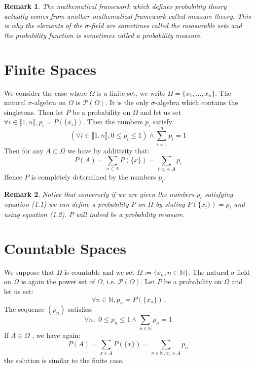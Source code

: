 \documentclass[10pt,a4paper]{book}
\newtheorem*{remark}{Remark}
\theoremstyle{definition}
\begin{document}
\begin{remark}
The mathematical framework which defines probability theory actually comes from another mathematical framework called measure theory. This is why the elements of the $\sigma$-field are sometimes called the measurable sets and the probability function is sometimes called a probability measure.
\end{remark}

\section{Finite Spaces}
We consider the case where $\Omega$ is a finite set, we write $\Omega = \{x_1, \ldots, x_n\}$. The natural $\sigma$-algebra on $\Omega$ is $\mathcal{P}(\Omega)$. It is the only $\sigma$-algebra which contains the singletons. Then let $P$ be a probability on $\Omega$ and let us set $\forall i \in \llbracket 1, n\rrbracket, p_i = P(\{x_i\})$. Then the numbers $p_i$ satisfy:
\begin{equation}
\left( \forall i \in \llbracket 1, n\rrbracket, 0 \leq p_i \leq 1\right) \land \sum_{i = 1}^n p_i = 1
\end{equation}
Then for any $A \subset \Omega$ we have by additivity that:
\begin{equation}
P(A) = \sum_{x \in A} P(\{x\}) = \sum_{i : x_i \in A} p_i
\end{equation}
Hence $P$ is completely determined by the numbers $p_i$.


\begin{remark}
Notice that conversely if we are given the numbers $p_i$ satisfying equation (1.1) we can define a probability $P$ on $\Omega$ by stating $P(\{x_i\}) = p_i$ and using equation (1.2). $P$ will indeed be a probability measure.
\end{remark}

\section{Countable Spaces}
We suppose that $\Omega$ is countable and we set $\Omega := \{ x_n , n \in \mathbb{N}\}$. The natural $\sigma$-field on $\Omega$ is again the power set of $\Omega$, i.e. $\mathcal{P}(\Omega)$. Let $P$ be a probability on $\Omega$ and let us set:
$$\forall n\in\mathbb{N}, p_n=P(\{x_n\}).$$
The sequence $(p_n)$ satisfies:
$$\forall n,\,\, 0\leq p_n\leq 1\land \sum_{n\in\mathbb{N}}p_n=1$$
If $A\in \Omega$ , we have again:
$$P(A)=\sum_{x\in A}P(\{x\})=\sum_{n\in\mathbb{N},x_n\in A}p_n$$
the solution is similar to the finite case.
\end{document}
